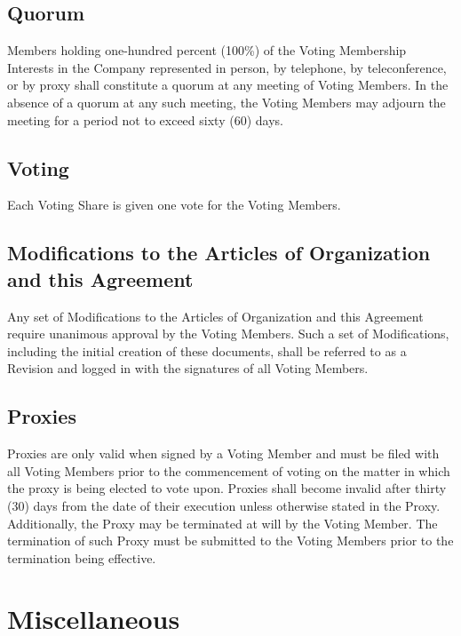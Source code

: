 \documentclass[11pt]{article}
\begin{document}
\subsection{Quorum}
Members holding one-hundred percent (100\%) of the Voting Membership Interests in the Company represented in person, by telephone, by teleconference, or by proxy shall constitute a quorum at any meeting of Voting Members. In the absence of a quorum at any such meeting, the Voting Members may adjourn the meeting for a period not to exceed sixty (60) days.

\subsection{Voting}
Each Voting Share is given one vote for the Voting Members.

\subsection{Modifications to the Articles of Organization and this Agreement}
Any set of Modifications to the Articles of Organization and this Agreement require unanimous approval by the Voting Members. Such a set of Modifications, including the initial creation of these documents, shall be referred to as a Revision and logged in  with the signatures of all Voting Members.

\subsection{Proxies}
Proxies are only valid when signed by a Voting Member and must be filed with all Voting Members prior to the commencement of voting on the matter in which the proxy is being elected to vote upon. Proxies shall become invalid after thirty (30) days from the date of their execution unless otherwise stated in the Proxy. Additionally, the Proxy may be terminated at will by the Voting Member. The termination of such Proxy must be submitted to the Voting Members prior to the termination being effective.

\section{Miscellaneous}
\end{document}
